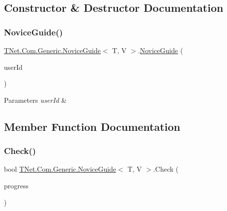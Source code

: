 \subsection{Constructor \& Destructor Documentation}
\mbox{\label{class_t_net_1_1_com_1_1_generic_1_1_novice_guide_a0a32c098c04bc4f268c37da3ebb1951e}} 
\subsubsection{\texorpdfstring{Novice\+Guide()}{NoviceGuide()}}
{\footnotesize\ttfamily \mbox{\hyperlink{class_t_net_1_1_com_1_1_generic_1_1_novice_guide}{T\+Net.\+Com.\+Generic.\+Novice\+Guide}}$<$ T, V $>$.\mbox{\hyperlink{class_t_net_1_1_com_1_1_generic_1_1_novice_guide}{Novice\+Guide}} (\begin{DoxyParamCaption}\item[{int}]{user\+Id }\end{DoxyParamCaption})\hspace{0.3cm}{\ttfamily [protected]}}






\begin{DoxyParams}{Parameters}
{\em user\+Id} & \\
\hline
\end{DoxyParams}


\subsection{Member Function Documentation}
\mbox{\label{class_t_net_1_1_com_1_1_generic_1_1_novice_guide_a6116a7001e7fa1d1215d4d3cdff887b2}} 
\subsubsection{\texorpdfstring{Check()}{Check()}}
{\footnotesize\ttfamily bool \mbox{\hyperlink{class_t_net_1_1_com_1_1_generic_1_1_novice_guide}{T\+Net.\+Com.\+Generic.\+Novice\+Guide}}$<$ T, V $>$.Check (\begin{DoxyParamCaption}\item[{out \mbox{\hyperlink{class_t_net_1_1_com_1_1_model_1_1_guide_progress_item}{Guide\+Progress\+Item}}}]{progress }\end{DoxyParamCaption})}



